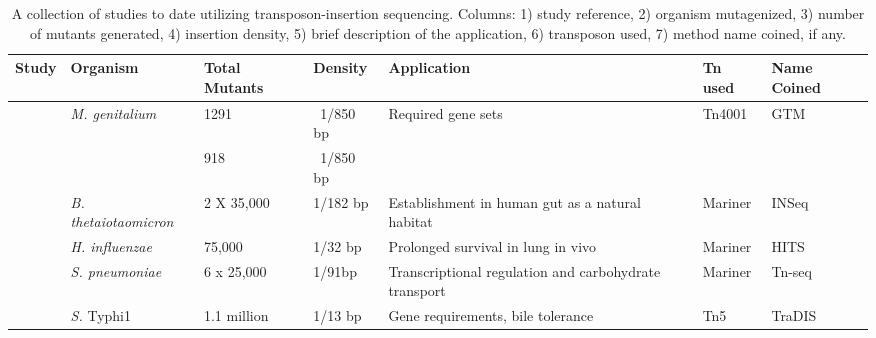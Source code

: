%
\begingroup
\begin{landscape}
   \tiny
   \noindent
    \begin{longtable}{ l
    				l
				l
				l
				p{2in}
				l
				l}
    \caption[Summary of transposon-insertion sequencing studies to date]{A collection of studies to date utilizing transposon-insertion sequencing. Columns: 1) study reference,  2) organism mutagenized, 3) number of mutants generated, 4) insertion density, 5) brief description of the application, 6) transposon used, 7) method name coined, if any.}
    \\
    \toprule
    \textbf{Study} & \textbf{Organism} & \textbf{Total Mutants} & \textbf{Density} & \textbf{Application} & \textbf{Tn used } & \textbf{Name Coined} \\
    \midrule
    \multirow{2}[1]{*}{\textcite{Hutchison1999}}  & \multirow{2}[1]{*}{\textit{M. genitalium}} & 1291  &  ~1/850 bp & \multirow{2}[1]{2in}{Required gene sets} & \multirow{2}[1]{*}{Tn4001} & \multirow{2}[1]{*}{GTM\nomenclature{GTM}{Global transposon mutagenesis} } \\
          &  \textit{M. pneumoniae}     & 918   & ~1/850 bp &       &       &  \\
    \multirow{2}[0]{*}{\textcite{Goodman2009}} & \multirow{2}[0]{*}{\textit{B. thetaiotaomicron}} & \multirow{2}[0]{*}{2 X 35,000} & \multirow{2}[0]{*}{1/182 bp} & \multirow{2}[0]{2in}{Establishment in human gut as a natural habitat} & \multirow{2}[0]{*}{Mariner} & \multirow{2}[0]{*}{INSeq} \\
          &       &       &       &       &       &  \\
    \multirow{2}[0]{*}{\textcite{Gawronski2009} } & \multirow{2}[0]{*}{\textit{H. influenzae}} & \multirow{2}[0]{*}{75,000} & \multirow{2}[0]{*}{1/32 bp} & \multirow{2}[0]{2in}{Prolonged survival in lung in vivo} & \multirow{2}[0]{*}{Mariner} & \multirow{2}[0]{*}{ HITS} \\
          &       &       &       &       &       &  \\
   \textcite{Opijnen2009}  & \textit{S. pneumoniae} & 6 x 25,000 & 1/91bp & Transcriptional regulation and carbohydrate transport & Mariner & Tn-seq \\
    \multirow{2}[0]{*}{\textcite{Langridge2009a}}  & \multirow{2}[0]{*}{{\it S.} Typhi1} & \multirow{2}[0]{*}{1.1 million} & 1/13 bp & \multirow{2}[0]{2in}{Gene requirements, bile tolerance} & \multirow{2}[0]{*}{Tn5} & \multirow{2}[0]{*}{TraDIS} \\

\end{longtable}
\end{landscape}
